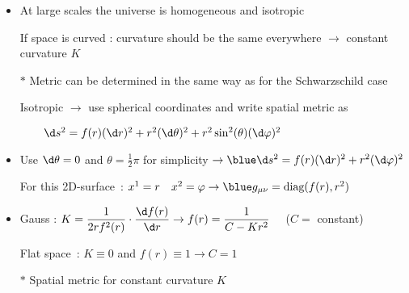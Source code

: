 \onecolumn
\begin{itemize}
\item At large scales the universe is homogeneous and isotropic
\item[] If space is curved : curvature should be the same everywhere
        $\rightarrow$ {\blue constant curvature $K$}
\item[$\ast$] Metric can be determined in the same way as for the Schwarzschild case
\item[] Isotropic $\rightarrow$ use spherical coordinates and write {\red spatial metric} as
\item[] {\blue $\qquad \d s^{2}=f(r)(\d r)^{2}+r^{2}(\d\theta)^{2}+r^{2}\sin^{2}(\theta)(\d\varphi)^{2}$}
\item Use $\d\theta=0$ and $\theta=\frac{1}{2}\pi$ for simplicity
      $\rightarrow {\blue \d s^{2}=f(r)(\d r)^{2}+r^{2}(\d\varphi)^{2}}$
\item[] For this 2D-surface~: $x^{1}=r \quad x^{2}=\varphi
        \rightarrow {\blue g_{\mu\nu}=\text{diag}(f(r),r^{2})}$
\item Gauss : $\displaystyle K=\frac{1}{2rf^{2}(r)} \cdot \frac{\d f(r)}{\d r}
               \rightarrow f(r)=\frac{1}{C-Kr^{2}} \quad$ ($C=$ constant)
\item[] Flat space~: $K \equiv 0$ and $f(r) \equiv 1 \rightarrow C=1$
\item[$\ast$] {\blue Spatial metric for constant curvature $K$}
\item[] \begin{center}
         {\red {}}
        \end{center}
\end{itemize}

